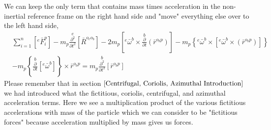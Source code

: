 We can keep the only term that contains mass times acceleration in the non-inertial reference frame on the right hand side and "move" everything else over to the left hand side,
\begin{align}&\sum^{n}_{i = 1}\left[{}^{e}\bar{F}^{p}_{i}\right]
 - m_{p}\overset{e}{\frac{\partial^{2}}{\partial t^{2}}}[\bar{R}^{o_{e}o_{b}}]
 - 2m_{p}\left[{}^{e}\bar{\omega}^{b}\times\overset{b}{\frac{\partial}{\partial t}}(\bar{r}^{o_{b}p})\right]
 - m_{p}\left\{{}^{e}\bar{\omega}^{b}\times\left[{}^{e}\bar{\omega}^{b}\times\left(\bar{r}^{o_{b}p}\right)\right]\right\} \\ &
 - m_{p}\left\{\overset{b}{\frac{\partial}{\partial t}}[{}^{e}\bar{\omega}^{b}]\right\}\times\bar{r}^{o_{b}p}
 = m_{p}\overset{b}{\frac{\partial^{2}}{\partial t^{2}}}[\bar{r}^{o_{b}p}] 
\label{Newtons Second Law Non-Inertial Verbose}
\end{align}
Please remember that in section $\ref{Centrifugal, Coriolis, Azimuthal Introduction}$ we had introduced what the fictitious, coriolis, centrifugal, and azimuthal acceleration terms.
Here we see a multiplication product of the various fictitious accelerations with mass of the particle which we can consider to be "fictitious forces" because acceleration multiplied by mass gives us forces. 

